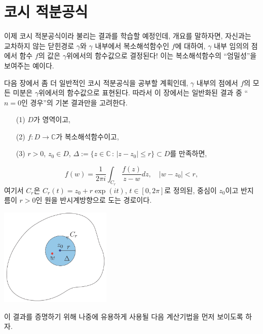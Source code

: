\section{코시 적분공식}

이제 코시 적분공식이라 불리는 결과를 학습할 예정인데,
개요를 말하자면, 자신과는 교차하지 않는 닫힌경로 $\gamma$와
$\gamma$ 내부에서 복소해석함수인 $f$에 대하여,
$\gamma$ 내부 임의의 점에서 함수 $f$의 값은
$\gamma$위에서의 함수값으로 결정된다!
이는 복소해석함수의 ``엄밀성''을 보여주는 예이다.

다음 장에서 좀 더 일반적인 코시 적분공식을 공부할 계획인데,
$\gamma$ 내부의 점에서 $f$의 모든 미분은 
$\gamma$위에서의 함수값으로 표현된다.
따라서 이 장에서는 일반화된 결과 중 ``$n=0$인 경우''의 기본 결과만을 고려한다.

\begin{salttheorem} {}{} \label{thm-3-6}
\begin{itemize}
\item[(1)] $D$가 영역이고,
\item[(2)] $f:D\to\mathbb C$가 복소해석함수이고,
\item[(3)] $r>0$, $z_0\in D$, 
$\Delta := \{ z\in \mathbb C\,:\, |z-z_0| \le r\} \subset D$를 만족하면,
\end{itemize}
\[
f(w) = \dfrac1{2\pi i} \int_{C_r} \dfrac{f(z)}{z-w} dz, 
\quad |w-z_0| <r,
\]
여기서 $C_r$은 $C_r(t) = z_0 + r\exp(it)$, $t\in [0,2\pi]$로 
정의된, 중심이 $z_0$이고 반지름이 $r>0$인 
원을 반시계방향으로 도는 경로이다.

\begin{center}
\includegraphics[width=0.4\textwidth]{./SaltChapter/fig-3-0-7}
\end{center}
\end{salttheorem}

이 결과를 증명하기 위해 나중에 유용하게 사용될 다음 계산기법을 먼저 보이도록 하자.

\newpage %

